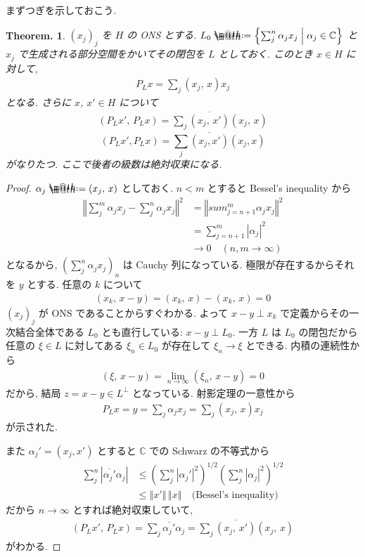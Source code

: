 \documentclass[openany, a4paper, oneside]{jsbook}
\makeatletter
\newcommand*{\defeq}{\mathrel{\rlap{%
\raisebox{0.3ex}{$\m@th\cdot$}}%
\raisebox{-0.3ex}{$\m@th\cdot$}}%
=}
\theoremstyle{break}
\newtheorem{thm}{Theorem.}[section]
\theoremstyle{breakdefn}
\newcommand{\abs}[1]{\left|#1\right|}
\newcommand{\norm}[1]{\left\Vert#1\right\Vert}
\newcommand{\rbk}[1]{\left (#1\right)}
\newcommand{\rbkt}[2]{\left ( #1,\,#2 \right)}
\newcommand{\relmiddle}[1]{\mathrel{}\middle#1\mathrel{}}
\newcommand{\set}[2]{\left\{#1 \relmiddle| #2\right\}}
\newcommand{\bbC}{\mathbb{C}}
\makeatother
\begin{document}
まずつぎを示しておこう.
\begin{thm}
 $(x_j)_j$ を $H$ の ONS とする.
 $L_0 \defeq \set{\sum_j^n \alpha_j x_j}{\alpha_j \in \bbC}$
 と $x_j$ で生成される部分空間をかいてその閉包を $L$ としておく.
 このとき $x \in H$ に対して,
 \begin{align}
  P_L x
  =
  \sum_j \rbkt{x_j}{x} x_j
 \end{align}
 となる.
 さらに $x$, $x' \in H$ について
 \begin{align}
  \rbkt{P_L x'}{P_L x}
  =
  \sum_j \overline{\rbkt{x_j}{x'}} \rbkt{x_j}{x}
 \end{align}
 \[
 (P_Lx', P_Lx) = \sum_j \overline{(x_j, x')}(x_j, x)
 \]
 がなりたつ.
 ここで後者の級数は絶対収束になる.
\end{thm}
\begin{proof}
$\alpha_j \defeq \rbkt{x_j}{x}$ としておく.
$n<m$ とすると Bessel's inequality から
\begin{align}
 \norm{\sum_j^m \alpha_j x_j - \sum_j^n \alpha_j x_j}^2
 &=
 \norm{sum_{j=n+1}^m \alpha_j x_j}^2 \\
 &=
 \sum_{j=n+1}^m \abs{\alpha_j}^2 \\
 &\to
 0 \quad (n, m \to \infty)
\end{align}
となるから, $(\sum_j^n \alpha_j x_j)_n$ は Cauchy 列になっている.
極限が存在するからそれを $y$ とする.
任意の $k$ について
\begin{align}
 \rbkt{x_k}{x - y}
 =
 \rbkt{x_k}{x} - \rbkt{x_k}{x}
 =
 0
\end{align}
$(x_j)_j$ が ONS であることからすぐわかる.
よって $x-y \perp x_k$ で定義からその一次結合全体である $L_0$ とも直行している: $x-y \perp L_0$.
一方 $L$ は $L_0$ の閉包だから任意の $\xi \in L$ に対してある $\xi_n \in L_0$ が存在して $\xi_n \to \xi$ とできる.
内積の連続性から
\begin{align}
 \rbkt{\xi}{x - y}
 =
 \lim_{n \to \infty} \rbkt{\xi_n}{x - y}
 =
 0
\end{align}
だから, 結局 $z = x-y \in L^{\perp}$ となっている.
射影定理の一意性から
\begin{align}
 P_Lx
 =
 y
 =
 \sum_j \alpha_j x_j
 =
 \sum_j \rbkt{x_j}{x} x_j
\end{align}
が示された.

また $\alpha_j' = (x_j, x')$ とすると $\bbC$ での Schwarz の不等式から
\begin{align}
 \sum_j^n \abs{\overline{\alpha_j'} \alpha_j}
 &\le
 \rbk{\sum_j^n|\alpha_j'|^2}^{1/2}
  \rbk{\sum_j^n \abs{\alpha_j}^2}^{1/2} \\
 &\le
 \norm{x'} \, \norm{x}
 \quad \text{(Bessel's inequality)}
\end{align}
だから $n \to \infty$ とすれば絶対収束していて,
\begin{align}
 \rbkt{P_L x'}{P_L x}
 =
 \sum_j \overline{\alpha_j'} \alpha_j
 =
 \sum_j \overline{\rbkt{x_j}{x'}} \rbkt{x_j}{x}
\end{align}
がわかる.
\end{proof}
\end{document}
